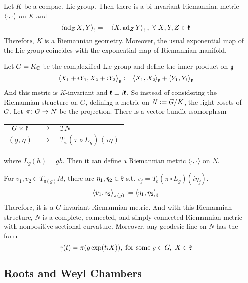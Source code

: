 \documentclass[a4paper,12pt]{article}
\begin{document}
	Let $K$ be a compact Lie group. Then there is a bi-invariant Riemannian metric $\left\langle \cdot,\cdot \right\rangle$ on $K$ and
	\begin{equation*}
		\left\langle \operatorname{ad}_ZX,Y \right\rangle_{\mathfrak{k}} = -\left\langle X,\operatorname{ad}_ZY \right\rangle_{\mathfrak{k}},~\forall~X,Y,Z \in \mathfrak{k}
	\end{equation*}
	Therefore, $K$ is a Riemannian geometry. Moreover, the usual exponential map of the Lie group coincides with the exponential map of Riemannian manifold. 

	Let $G=K_{\mathbb{C}}$ be the complexified Lie group and define the inner product on $\mathfrak{g}$
	\begin{equation*}
		\left\langle X_1+iY_1,X_2+iY_2 \right\rangle_{\mathfrak{g}} \vcentcolon= \left\langle X_1,X_2 \right\rangle_{\mathfrak{k}} + \left\langle Y_1,Y_2 \right\rangle_{\mathfrak{k}}
	\end{equation*}
	And this metric is $K$-invariant and $\mathfrak{k} \perp i\mathfrak{k}$. So instead of considering the Riemannian structure on $G$, defining a metric on $N \vcentcolon= G/K$, the right cosets of $G$. Let $\pi \colon G \rightarrow N$ be the projection. There is a vector bundle isomorphism
	\begin{center}
		\begin{tabular}{c c l}
			$G \times \mathfrak{k}$ & $\longrightarrow$ & $TN$ \\
			$(g,\eta)$ & $\longmapsto$ & $T_e(\pi \circ L_g)(i\eta)$
		\end{tabular}
	\end{center}
	where $L_g(h) = gh$. Then it can define a Riemannian metric $\left\langle \cdot,\cdot \right\rangle$ on $N$. 

	For $v_1,v_2 \in T_{\pi(g)}M$, there are $\eta_1,\eta_2 \in \mathfrak{k}$ s.t. $v_j = T_e(\pi \circ L_g)(i\eta_j)$.
	\begin{equation*}
		\left\langle v_1,v_2 \right\rangle_{\pi(g)} \vcentcolon= \left\langle \eta_1,\eta_2 \right\rangle_{\mathfrak{k}}
	\end{equation*}
	Therefore, it is a $G$-invariant Riemannian metric. And with this Riemannian structure, $N$ is a complete, connected, and simply connected Riemannian metric with nonpositive sectional curvature. Moreover, any geodesic line on $N$ has the form
	\begin{equation*}
		\gamma(t) = \pi(g\exp(tiX)),\text{ for some }g\in G,~X \in \mathfrak{k}
	\end{equation*}

	\subsection{Roots and Weyl Chambers}
\end{document}
